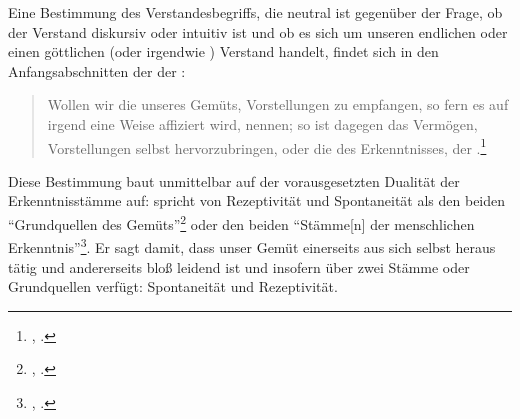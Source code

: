 Eine Bestimmung des Verstandesbegriffs, die neutral ist gegenüber der Frage, ob
der Verstand diskursiv oder intuitiv ist und ob es sich um unseren endlichen
oder einen göttlichen (oder irgendwie ) Verstand handelt,
findet sich in den Anfangsabschnitten der  der
:
\begin{quote}
Wollen wir die  unseres Gemüts, Vorstellungen zu empfangen, so
fern es auf irgend eine Weise affiziert wird,  nennen; so ist
dagegen das Vermögen, Vorstellungen selbst hervorzubringen, oder die
 des Erkenntnisses, der
.\footnote{\cite[][B 75]{Kant:KritikderreinenVernunft2003},
\cite[][III: 75.5--8]{Kant:GesammelteWerke1900ff.}.}
\end{quote}
Diese Bestimmung baut unmittelbar auf der vorausgesetzten Dualität der
Erkenntnisstämme auf:  spricht von Rezeptivität und
Spontaneität als den beiden \enquote{Grund\-quel\-len des
Gemüts}\footnote{\cite[][B 74]{Kant:KritikderreinenVernunft2003},
\cite[][III: 74.9]{Kant:GesammelteWerke1900ff.}.} oder den beiden
\enquote{Stämme[n] der menschlichen Erkenntnis}\footnote{\cite[][B
29]{Kant:KritikderreinenVernunft2003}, \cite[][III:
46.7]{Kant:GesammelteWerke1900ff.}.}. Er sagt damit, dass unser Gemüt einerseits
aus sich selbst heraus tätig und andererseits bloß leidend ist und insofern über
zwei Stämme oder Grundquellen verfügt: Spontaneität und Rezeptivität.

